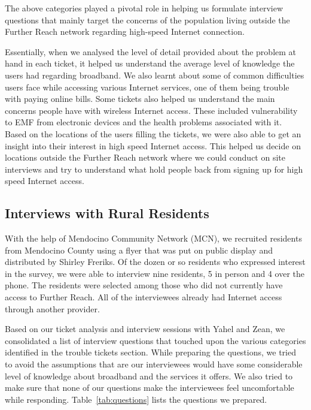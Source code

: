 The above categories played a pivotal role in helping us formulate interview questions that mainly target the concerns of the population living outside the Further Reach network regarding high-speed Internet connection.

Essentially, when we analysed the level of detail provided about the problem
at hand in each ticket, it helped us understand the average level of knowledge
the users had regarding broadband. We also learnt about some of common
difficulties users face while accessing various Internet services, one of them
being trouble with paying online bills. Some tickets also helped us understand
the main concerns people have with wireless Internet access. These included
vulnerability to EMF from electronic devices and the health problems
associated with it. Based on the locations of the users filling the tickets,
we were also able to get an insight into their interest in high speed Internet
access. This helped us decide on locations outside the Further Reach network
where we could conduct on site interviews and try to understand what hold
people back from signing up for high speed Internet access. 

\subsection{Interviews with Rural Residents}
\label{sec:interv-with-rural}

With the help of Mendocino Community Network (MCN), we recruited 
residents from Mendocino County using a flyer that was put on public display
and distributed by Shirley Freriks.
Of the dozen or so residents who expressed interest in the survey, we were able to interview
nine residents, 5 in person and 4 over the phone. The residents were selected among those
who did not currently have access to Further Reach. All of the interviewees
already had Internet access through another provider.

Based on our ticket analysis and interview sessions with Yahel and Zean, we consolidated a list of interview 
questions that touched upon the various categories identified in the trouble tickets section. While preparing
the questions, we tried to avoid the assumptions that are our interviewees would have some considerable level 
of knowledge about broadband and the services it offers. We also tried to make sure that none of our questions
make the interviewees feel uncomfortable while responding. Table~\ref{tab:questions} lists the questions
we prepared.

